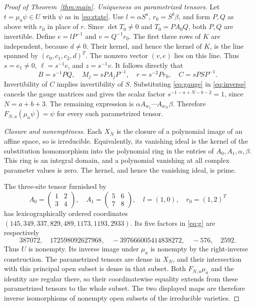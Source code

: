 \documentclass[11pt]{article}
\begin{document}
\begin{proof}[Proof of Theorem~\ref{thm:main}]
\emph{Uniqueness on parametrized tensors.}
Let $t=\mu_a\psi\in U$ with $\psi$ as in \eqref{eq:state}.
Use $l=\alpha S^a$, $r_0=S^b\beta$, and form $P,Q$ as above with
$r_0$ in place of $r$. Since $\det T_0\ne0$ and $T_0=PA_0Q$,
both $P,Q$ are invertible. Define $e=lP^{-1}$ and $v=Q^{-1}r_0$.
The first three rows of $K$ are independent, because $d\ne0$.
Their kernel, and hence the kernel of $K$, is the line spanned by
$(c_0,c_1,c_2,d)^T$. The nonzero vector $(v,e)$ lies on this line.
Thus $s=e_1\ne0$, $\ell=s^{-1}e$, and $z=s^{-1}v$.
It follows directly that
\begin{equation}\label{eq:gauge}
 B=s^{-1}PQ,\quad M_j=sPA_jP^{-1},\quad
 r=s^{-2}Pr_0,\quad C=sPSP^{-1}.
\end{equation}
Invertibility of $C$ implies invertibility of $S$. Substituting
\eqref{eq:gauge} in \eqref{eq:inverse} cancels the gauge matrices and
gives the scalar factor
$s^{-1-a+N-b-2}=1$, since $N=a+b+3$. The remaining expression is
$\alpha A_{w_1}\cdots A_{w_N}\beta$. Therefore
$F_{N,a}(\mu_a\psi)=\psi$ for every such parametrized tensor.

\emph{Closure and nonemptiness.}
Each $X_N$ is the closure of a polynomial image of an affine space,
so is irreducible. Equivalently, its vanishing ideal is the kernel of
the substitution homomorphism into the polynomial ring in the entries
of $A_0,A_1,\alpha,\beta$. This ring is an integral domain, and a
polynomial vanishing at all complex parameter values is zero. The
kernel, and hence the vanishing ideal, is prime.

The three-site tensor furnished by
\begin{equation}\label{eq:witness}
 A_0=\begin{pmatrix}1&2\\3&4\end{pmatrix},\quad
 A_1=\begin{pmatrix}5&6\\7&8\end{pmatrix},\quad
 l=(1,0),\quad r_0=(1,2)^T
\end{equation}
has lexicographically ordered coordinates
$(145,349,337,829,489,1173,1193,2933)$. Its five factors in
\eqref{eq:g} are respectively
\[
 387072,\quad172598092627968,\quad-397666005414838272,
 \quad-576,\quad2592.
\]
Thus $U$ is nonempty. Its inverse image under $\mu_a$ is nonempty by
the right-inverse construction. The parametrized tensors are dense in
$X_N$, and their intersection with this principal open subset is dense
in that subset. Both $F_{N,a}\mu_a$ and the identity are regular there,
so their coordinatewise equality extends from these parametrized tensors
to the whole subset. The two displayed maps are therefore inverse
isomorphisms of nonempty open subsets of the irreducible varieties.
\end{proof}
\end{document}
